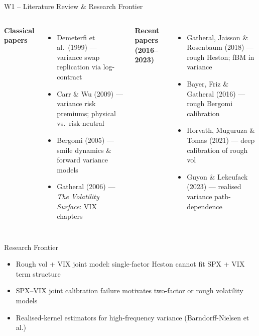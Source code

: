 \documentclass[aspectratio=169, 11pt]{beamer}
\begin{document}
\begin{frame}{W1 -- Literature Review \& Research Frontier}

\begin{columns}[T]
\textbf{Classical papers}
\begin{itemize}
  \item Demeterfi et al.\ (1999) --- variance swap replication via log-contract
  \item Carr \& Wu (2009) --- variance risk premiums; physical vs.\ risk-neutral
  \item Bergomi (2005) --- smile dynamics \& forward variance models
  \item Gatheral (2006) --- \textit{The Volatility Surface}: VIX chapters
\end{itemize}

\textbf{Recent papers (2016--2023)}
\begin{itemize}
  \item Gatheral, Jaisson \& Rosenbaum (2018) --- rough Heston; fBM in variance
  \item Bayer, Friz \& Gatheral (2016) --- rough Bergomi calibration
  \item Horvath, Muguruza \& Tomas (2021) --- deep calibration of rough vol
  \item Guyon \& Lekeufack (2023) --- realised variance path-dependence
\end{itemize}
\end{columns}

\vspace{6pt}
\begin{block}{Research Frontier}
\begin{itemize}
  \item Rough vol + VIX joint model: single-factor Heston cannot fit SPX + VIX term structure
  \item SPX--VIX joint calibration failure motivates two-factor or rough volatility models
  \item Realised-kernel estimators for high-frequency variance (Barndorff-Nielsen et al.)
\end{itemize}
\end{block}
\end{frame}
\end{document}
